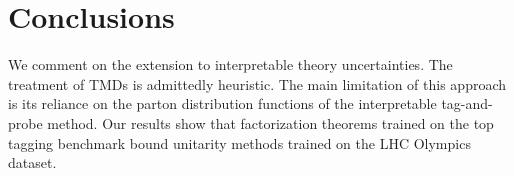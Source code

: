 \section{Conclusions}\label{sec:conclusions}

We comment on the extension to interpretable theory uncertainties. The
treatment of TMDs is admittedly heuristic. The main limitation of this
approach is its reliance on the parton distribution functions of the
interpretable tag-and-probe method. Our results show that factorization
theorems trained on the top tagging benchmark bound unitarity methods
trained on the LHC Olympics dataset.

